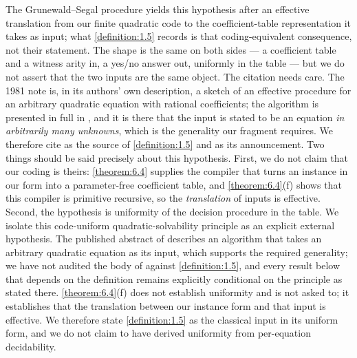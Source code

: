 \documentclass[11pt]{article}
\theoremstyle{plain}
\theoremstyle{definition}
\theoremstyle{remark}
\theoremstyle{plain}
\theoremstyle{definition}
\theoremstyle{remark}
\theoremstyle{plain}
\theoremstyle{definition}
\theoremstyle{remark}
\begin{document}
The Grunewald–Segal procedure yields this hypothesis after an effective translation from our finite quadratic code to the coefficient-table representation it takes as input; what \cref{definition:1.5} records is that coding-equivalent consequence, not their statement. The shape is the same on both sides — a coefficient table and a witness arity in, a yes/no answer out, uniformly in the table — but we do not assert that the two inputs are the same object. The citation needs care. The 1981 note \cite{GS81} is, in its authors' own description, a sketch of an effective procedure for an arbitrary quadratic equation with rational coefficients; the algorithm is presented in full in \cite{GS04}, and it is there that the input is stated to be an equation \emph{in arbitrarily many unknowns}, which is the generality our fragment requires. We therefore cite \cite{GS04} as the source of \cref{definition:1.5} and \cite{GS81} as its announcement. Two things should be said precisely about this hypothesis. First, we do not claim that our coding is theirs: \cref{theorem:6.4} supplies the compiler that turns an instance in our form into a parameter-free coefficient table, and \cref{theorem:6.4}(f) shows that this compiler is primitive recursive, so the \emph{translation} of inputs is effective. Second, the hypothesis is uniformity of the decision procedure in the table. We isolate this code-uniform quadratic-solvability principle as an explicit external hypothesis. The published abstract of \cite{GS04} describes an algorithm that takes an arbitrary quadratic equation as its input, which supports the required generality; we have not audited the body of \cite{GS04} against \cref{definition:1.5}, and every result below that depends on the definition remains explicitly conditional on the principle as stated there. \cref{theorem:6.4}(f) does not establish uniformity and is not asked to; it establishes that the translation between our instance form and that input is effective. We therefore state \cref{definition:1.5} as the classical input in its uniform form, and we do not claim to have derived uniformity from per-equation decidability.
\end{document}
